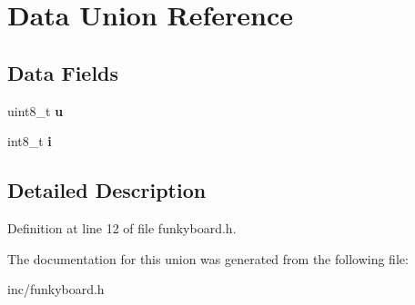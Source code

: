 \hypertarget{unionData}{}\section{Data Union Reference}
\label{unionData}
\subsection*{Data Fields}
\begin{DoxyCompactItemize}
\item 
\mbox{\label{unionData_a6d913633423729c5773303b505873597}} 
uint8\+\_\+t {\bfseries u}
\item 
\mbox{\label{unionData_a611d229e5820bb45c641d1e27be9eaa7}} 
int8\+\_\+t {\bfseries i}
\end{DoxyCompactItemize}


\subsection{Detailed Description}


Definition at line 12 of file funkyboard.\+h.



The documentation for this union was generated from the following file\+:\begin{DoxyCompactItemize}
\item 
inc/funkyboard.\+h\end{DoxyCompactItemize}
